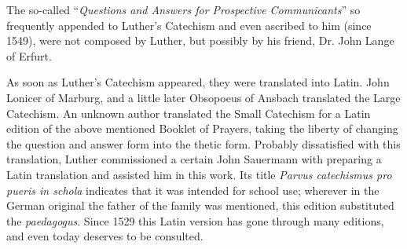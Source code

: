 The so-called “\emph{Questions and Answers for Prospective Communicants}” so frequently appended to Luther’s Catechism and even ascribed to him (since 1549), were not composed by Luther, but possibly by his friend, Dr. John Lange of Erfurt.

As soon as Luther’s Catechism appeared, they were translated into Latin. John Lonic­er of Marburg, and a little later Obsopoeus of Ansbach translated the Large Catechism. An unknown author translated the Small Catechism for a Latin edition of the above mentioned Booklet of Prayers, taking the liberty of changing the question and answer form into the thetic form. Probably dissatisfied with this translation, Luther commissioned a certain John Sauermann with preparing a Latin translation and assisted him in this work. Its title \emph{Parvus catechismus pro pueris in schola} indicates that it was intended for school use; wherever in the German original the father of the family was mentioned, this edition substituted the \emph{paedagogus}. Since 1529 this Latin version has gone through many editions, and even today deserves to be consulted.

